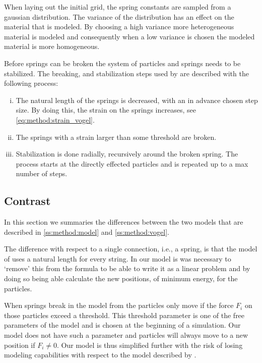 When laying out the initial grid, the spring constants are sampled from a gaussian distribution. The variance of the distribution has an effect on the material that is modeled. By choosing a high variance more heterogeneous material is modeled and consequently when a low variance is chosen the modeled material is more homogeneous.

Before springs can be broken the system of particles and springs needs to be stabilized. The breaking, and stabilization steps used by \citeauthor{vogel2005studies2} are described with the following process:
\begin{enumerate}[(i)]
	\item The natural length of the springs is decreased, with an in advance chosen step size. By doing this, the strain on the springs increases, see \cref{eq:method:strain_vogel}.
	\item The springs with a strain larger than some threshold are broken.
	\item Stabilization is done radially, recursively around the broken spring. The process starts at the directly effected particles and is repeated up to a max number of steps. 
\end{enumerate}

\subsection{Contrast}\label{ss:method:contrast}

In this section we summaries the differences between the two models that are described in \cref{ss:method:model} and \cref{ss:method:vogel}. 

The difference with respect to a single connection, i.e., a spring, is that the model of \citeauthor{vogel2005studies2} uses a natural length for every string. In our model is was necessary to `remove' this from the formula to be able to write it as a linear problem and by doing so being able calculate the new positions, of minimum energy, for the particles.

When springs break in the model from \citeauthor{vogel2005studies2} the particles only move if the force $F_i$ on those particles exceed a threshold. This threshold parameter is one of the free parameters of the model and is chosen at the beginning of a simulation. Our model does not have such a parameter and particles will always move to a new position if $F_i \neq 0$. Our model is thus simplified further with the risk of losing modeling capabilities with respect to the model described by \citeauthor{vogel2005studies1}.

